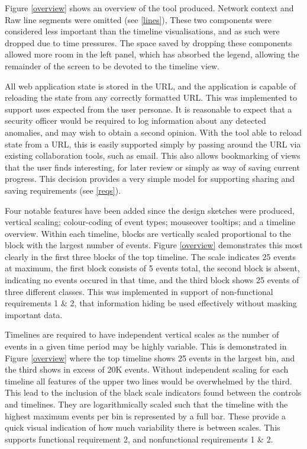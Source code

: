 Figure \ref{overview} shows an overview of the tool produced. Network context and Raw line segments were omitted (see \ref{lines}), These two components were considered less important than the timeline visualisations, and as such were dropped due to time pressures.  The space saved by dropping these components allowed more room in the left panel, which has absorbed the legend, allowing the remainder of the screen to be devoted to the timeline view. 

All web application state is stored in the URL, and the application is capable of reloading the state from any correctly formatted URL. This was implemented to support uses expected from the user personae. It is reasonable to expect that a security officer would be required to log information about any detected anomalies, and may wish to obtain a second opinion.
With the tool able to reload state from a URL, this is easily supported simply by passing around the URL via existing collaboration tools, such as email. 
This also allows bookmarking of views that the user finds interesting, for later review or simply as way of saving current progress.  This decision provides a very simple model for supporting sharing and saving requirements (see \ref{reqs}).

Four notable features have been added since the design sketches were produced, vertical scaling; colour-coding of event types; mouseover tooltips; and a timeline overview. 
Within each timeline, blocks are vertically scaled proportional to the block with the largest number of events. Figure \ref{overview} demonstrates this most clearly in the first three blocks of the top timeline. The scale indicates 25 events at maximum, the first block consists of 5 events total, the second block is absent, indicating no events occured in that time, and the third block shows 25 events of three different classes. This was implemented in support of non-functional requirements 1 \& 2, that information hiding be used effectively without masking important data.

Timelines are required to have independent vertical scales as the number of events in a given time period may be highly variable. This is demonstrated in Figure \ref{overview} where the top timeline shows 25 events in the largest bin, and the third shows in excess of 20K events. Without independent scaling for each timeline all features of the upper two lines would be overwhelmed by the third. This lead to the inclusion of the black scale indicators found between the controls and timelines. They are logarithmically scaled such that the timeline with the highest maximum events per bin is represented by a full bar. These provide a quick visual indication of how much variability there is between scales. This supports functional requirement 2, and nonfunctional requirements 1 \& 2.

